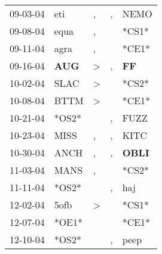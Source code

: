 \begin{supertabular}{p{0.07\textwidth}p{0.06\textwidth}p{0.02\textwidth}p{0.02\textwidth}p{0.06\textwidth}}
          09-03-04\textsuperscript{} &            eti\textsuperscript{} &                , &                , &           NEMO\textsuperscript{} \\
          09-08-04\textsuperscript{} &           equa\textsuperscript{} &                , &                  &                            *CS1* \\
          09-11-04\textsuperscript{} &           agra\textsuperscript{} &                , &                  &                            *CE1* \\
          09-16-04\textsuperscript{} &   \textbf{AUG\textsuperscript{}} &     \textgreater &                , &    \textbf{FF\textsuperscript{}} \\
          10-02-04\textsuperscript{} &           SLAC\textsuperscript{} &     \textgreater &                  &                            *CS2* \\
          10-08-04\textsuperscript{} &           BTTM\textsuperscript{} &     \textgreater &                  &                            *CE1* \\
          10-21-04\textsuperscript{} &                            *OS2* &                  &                , &           FUZZ\textsuperscript{} \\
          10-23-04\textsuperscript{} &           MISS\textsuperscript{} &                , &                , &           KITC\textsuperscript{} \\
          10-30-04\textsuperscript{} &           ANCH\textsuperscript{} &                , &                , &  \textbf{OBLI\textsuperscript{}} \\
          11-03-04\textsuperscript{} &           MANS\textsuperscript{} &                , &                  &                            *CS2* \\
          11-11-04\textsuperscript{} &                            *OS2* &                  &                , &            haj\textsuperscript{} \\
          12-02-04\textsuperscript{} &           5ofb\textsuperscript{} &     \textgreater &                  &                            *CS1* \\
          12-07-04\textsuperscript{} &                            *OE1* &                  &                  &                            *CE1* \\
          12-10-04\textsuperscript{} &                            *OS2* &                  &                , &           peep\textsuperscript{} \\

\end{supertabular}
